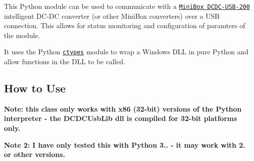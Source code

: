 This Python module can be used to communicate with a \href{http://www.mini-box.com/DCDC-USB-200}{\tt Mini\+Box D\+C\+D\+C-\/\+U\+S\+B-\/200} intelligent D\+C-\/\+DC converter (or other Mini\+Box converters) over a U\+SB connection. This allows for status monitoring and configuration of paramters of the module.

It uses the Python \href{https://docs.python.org/3/library/ctypes.html}{\tt {\ttfamily ctypes}} module to wrap a Windows D\+LL in pure Python and allow functions in the D\+LL to be called.

\subsection*{How to Use}

{\bfseries Note\+: this class only works with x86 (32-\/bit) versions of the Python interpreter -\/ the D\+C\+D\+C\+Usb\+Lib dll is compiled for 32-\/bit platforms only.}

{\bfseries Note 2\+: I have only tested this with Python 3.. -\/ it may work with 2. or other versions.}


